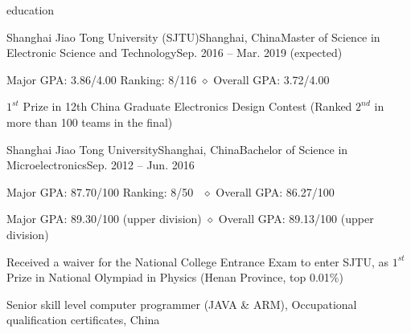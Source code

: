 \documentclass{resume_ucla} %
\begin{document}

\begin{rSection}{education}
\begin{rSubsection}{Shanghai Jiao Tong University (SJTU)}{Shanghai, China}{Master of Science in Electronic Science and Technology}{Sep. 2016 -- Mar. 2019 (expected)}
\item Major GPA: 3.86/4.00 \qquad Ranking: 8/116 \qquad $\diamond$ Overall GPA: 3.72/4.00
\item $1^{st}$ Prize in 12th China Graduate Electronics Design Contest (Ranked $2^{nd}$ in more than 100 teams in the final)
\end{rSubsection}
\begin{rSubsection}{Shanghai Jiao Tong University}{Shanghai, China}{Bachelor of Science in Microelectronics}{Sep. 2012 -- Jun. 2016}
\item Major GPA: 87.70/100 \qquad Ranking: 8/50 \qquad \ $\diamond$ Overall GPA: 86.27/100
\item Major GPA: 89.30/100 (upper division) \qquad \qquad$\diamond$ Overall GPA: 89.13/100 (upper division)
\item Received a waiver for the National College Entrance Exam to enter SJTU, as $1^{st}$ Prize in National Olympiad in Physics (Henan Province, top 0.01$\%$)
\item Senior skill level computer programmer (JAVA \& ARM), Occupational qualification certificates, China
\end{rSubsection}

\begin{comment}
\textbf{Shanghai Jiao Tong University (SJTU), Shanghai}
\\\emph{Master of Science in Electronic Science and Technology} \hfill \emph{Sep. 2016 -- Mar. 2019(expected)}
\\\bm{$\diamond$} Major GPA: 3.86/4.00 \qquad Ranking: 8/116 \qquad $\diamond$ Overall GPA: 3.72/4.00
\\\bm{$\diamond$} $1^{st}$ Prize in 12th China Graduate Electronics Design Contest (Ranked $2^{nd}$ in more than 100 teams in the final)
\\\emph{Bachelor of Science in Microelectronics} \hfill \emph{Sep. 2012 -- Jun. 2016}
\\\bm{$\diamond$} Major GPA: 87.70/100 \qquad Ranking: 8/50 \qquad \ $\diamond$ Overall GPA: 86.27/100
\\\bm{$\diamond$} Major GPA: 89.30/100(upper division) \qquad \qquad$\diamond$ Overall GPA: 89.13/100(upper division)
\\\bm{$\diamond$} Received a waiver for the National College Entrance Exam to enter SJTU, as $1^{st}$ Prize in National Olympiad in Physics (Henan Province, top 0.01$\%$)
\end{comment}

\end{rSection}
\end{document}
